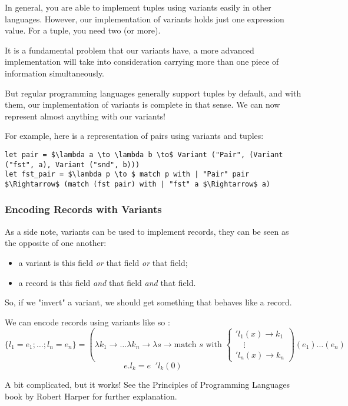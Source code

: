 In general, you are able to implement tuples using variants easily in other languages.
However, our implementation of variants holds just one expression value. For a tuple, you need two (or more).

It is a fundamental problem that our variants have, a more advanced implementation will take into consideration
carrying more than one piece of information simultaneously.

But regular programming languages generally support tuples by default, and with them,
our implementation of variants is complete in that sense. We can now represent almost anything with our variants!

For example, here is a representation of pairs using variants and tuples:
\begin{lstlisting}[mathescape]
let pair = $\lambda a \to \lambda b \to$ Variant ("Pair", (Variant ("fst", a), Variant ("snd", b)))
let fst_pair = $\lambda p \to $ match p with | "Pair" pair $\Rightarrow$ (match (fst pair) with | "fst" a $\Rightarrow$ a)
\end{lstlisting}

\subsubsection{Encoding Records with Variants}

As a side note, variants can be used to implement records, they can be seen as the opposite of one another: 
\begin{itemize}
  \item a variant is this field \textit{or} that field \textit{or} that field;
  \item a record is this field \textit{and} that field \textit{and} that field.
\end{itemize}

So, if we "invert" a variant, we should get something that behaves like a record.

We can encode records using variants like so \cite{HarperPL}:
\[
\{l_1 = e_1; \dots; l_n = e_n\} = 
(\lambda k_1 \to \dots \lambda k_n \to \lambda s \to 
\text{match } s \text{ with } 
\begin{cases}
    'l_1(x) \to k_1 \\
    \quad \vdots \quad \\
    'l_n(x) \to k_n
\end{cases}
)(e_1) \dots (e_n)
\]
\[
e.l_k = e \;\; 'l_k(0)
\]

A bit complicated, but it works! See the Principles of Programming Languages book by Robert Harper \cite{HarperPL} for further explanation.
